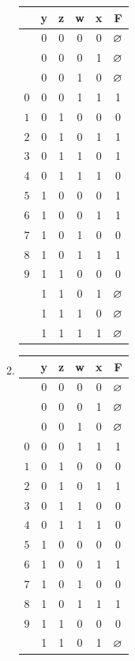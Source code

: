 \documentclass[]{../../../../tex/classes/homework}
\newcommand\DC{$\vn$}
\begin{document}
\begin{enumerate}
\begin{multicols}{3}
\begin{enumerate}
\begin{center}
\begin{tabular}{ c c c c c|c }
						\en{No.} & y & z & w & x & F \\
						\hline
						   & 0 & 0 & 0 & 0 & \DC \\ 
						   & 0 & 0 & 0 & 1 & \DC \\ 
						   & 0 & 0 & 1 & 0 & \DC \\ 
						$0$& 0 & 0 & 1 & 1 & 1 \\ 
						$1$& 0 & 1 & 0 & 0 & 0 \\ 
						$2$& 0 & 1 & 0 & 1 & 1 \\ 
						$3$& 0 & 1 & 1 & 0 & 1 \\ 
						$4$& 0 & 1 & 1 & 1 & 0 \\ 
						$5$& 1 & 0 & 0 & 0 & 1 \\ 
						$6$& 1 & 0 & 0 & 1 & 1 \\ 
						$7$& 1 & 0 & 1 & 0 & 0 \\ 
						$8$& 1 & 0 & 1 & 1 & 1 \\
						$9$& 1 & 1 & 0 & 0 & 0 \\ 
						   & 1 & 1 & 0 & 1 & \DC \\ 
						   & 1 & 1 & 1 & 0 & \DC \\ 
						   & 1 & 1 & 1 & 1 & \DC
					\end{tabular}
				\end{center}
				\item \begin{center}
					\begin{tabular}{ c c c c c|c }
						\en{No.} & y & z & w & x & F \\
						\hline
						   & 0 & 0 & 0 & 0 & \DC \\ 
						   & 0 & 0 & 0 & 1 & \DC \\ 
						   & 0 & 0 & 1 & 0 & \DC \\ 
						$0$& 0 & 0 & 1 & 1 & 1 \\ 
						$1$& 0 & 1 & 0 & 0 & 0 \\ 
						$2$& 0 & 1 & 0 & 1 & 1 \\ 
						$3$& 0 & 1 & 1 & 0 & 0 \\ 
						$4$& 0 & 1 & 1 & 1 & 0 \\ 
						$5$& 1 & 0 & 0 & 0 & 0 \\ 
						$6$& 1 & 0 & 0 & 1 & 1 \\ 
						$7$& 1 & 0 & 1 & 0 & 0 \\ 
						$8$& 1 & 0 & 1 & 1 & 1 \\
						$9$& 1 & 1 & 0 & 0 & 0 \\ 
						   & 1 & 1 & 0 & 1 & \DC \\ 

\end{tabular}
\end{center}
\end{enumerate}
\end{multicols}
\end{enumerate}
\end{document}
